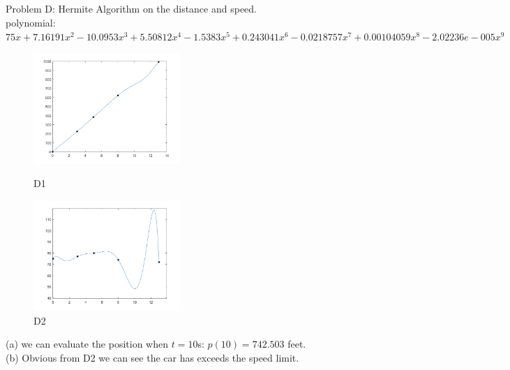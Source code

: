 \documentclass[12pt,letterpaper]{article}
\begin{document}
  \subsection*{} 
    Problem D: Hermite Algorithm on the distance and speed.\\
    polynomial: $75x+7.16191x^{2}-10.0953x^{3}+5.50812x^{4}-1.5383x^{5}+0.243041x^{6}-0.0218757x^{7}+0.00104059x^{8}-2.02236e-005x^{9}$\\
    \begin{figure}[h]
      \begin{minipage}[t]{0.5\linewidth}
      \centering
      \includegraphics[width=2.2in]{pic/D_1.png}
      \caption{D1}
      \label{fig:side:a}
      \end{minipage}%
      \begin{minipage}[t]{0.5\linewidth}
      \centering
      \includegraphics[width=2.2in]{pic/D_2.png}
      \caption{D2}
      \label{fig:side:b}
      \end{minipage}
    \end{figure}
    (a) we can evaluate the position when $t = 10$s: $p(10) = 742.503$ feet.\\
    (b) Obvious from D2 we can see the car has exceeds the speed limit.
\end{document}
